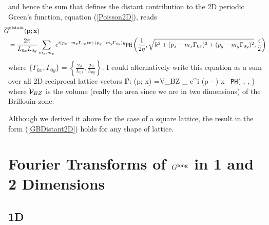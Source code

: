 \documentclass[letterpaper]{article}
\newcommand{\GB}{\overline{G}}
\newcommand{\vbGamma}{\boldsymbol{\Gamma}}
\begin{document}
and hence the sum that defines the distant contribution to the
2D periodic Green's function, equation (\ref{Poisson2D}), 
reads
\begin{align*}
&\hspace{-0.1in}\GB\sups{distant}(\vb p; \vb x) 
\\
&=\frac{2\pi}{L_{0x} L_{0y}} \sum_{m_x, m_y}
    e^{i (p_x - m_x\Gamma_{0x}) x + (p_y-m_y \Gamma_{0y}) y}
    \texttt{PH}\left( \frac{1}{2\eta}, 
                      \sqrt{k^2 + (p_x-m_x \Gamma_{0x})^2 + (p_y-m_y\Gamma_{0y})^2},
                      \frac{z}{2}
               \right)
\end{align*}
where $\{\Gamma_{0x}, \Gamma_{0y}\}=\left\{\frac{2\pi}{L_{0x}}, \frac{2\pi}{L_{0y}}\right\}$.
I could alternatively write this equation as a sum over all 
2D reciprocal lattice vectors $\vbGamma$:
{
   \GB{}(\vb p; \vb x) 
   =\mc V_{BZ} \sum_{\vbGamma} 
    e^{i (\vb p - \vbGamma) \cdot \vb x} \,
    \texttt{PH}\left( , 
                      \sqrt{k^2 + |\vb p - \vbGamma|^2},
               \right)
}
where $\mathcal{V}_{BZ}$ is the volume (really the area since we 
are in two dimensions) of the Brillouin zone.

Although we derived it above for the case of a square lattice,
the result in the form (\ref{GBDistant2D}) holds for any 
shape of lattice.

\appendix 

\section{Fourier Transforms of $G^{\hbox{\scriptsize{long}}}$ in 1 and 2 Dimensions}

\subsection{1D}
\end{document}
